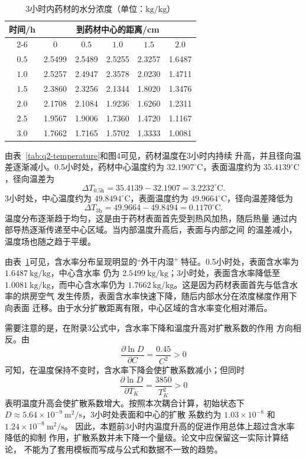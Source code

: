 \documentclass[12pt,a4paper]{article}
\begin{document}
\begin{table}[H]
\centering
\caption{3小时内药材的水分浓度（单位：$\mathrm{kg/kg}$）}
\label{tab:q2-moisture}
\begin{tabular}{cccccc}
\toprule
\multirow{2}{*}{时间/h}
& \multicolumn{5}{c}{到药材中心的距离/cm}\\
\cmidrule(lr){2-6}
& $0$ & $0.5$ & $1.0$ & $1.5$ & $2.0$\\
\midrule
$0.5$ & 2.5499 & 2.5489 & 2.5255 & 2.3257 & 1.6487\\
$1.0$ & 2.5257 & 2.4947 & 2.3578 & 2.0230 & 1.4711\\
$1.5$ & 2.3860 & 2.3256 & 2.1344 & 1.8020 & 1.3476\\
$2.0$ & 2.1708 & 2.1084 & 1.9236 & 1.6260 & 1.2311\\
$2.5$ & 1.9567 & 1.9006 & 1.7360 & 1.4720 & 1.1167\\
$3.0$ & 1.7662 & 1.7165 & 1.5702 & 1.3333 & 1.0081\\
\bottomrule
\end{tabular}
\end{table}


由表~\ref{tab:q2-temperature}和图4可见，药材温度在3小时内持续
升高，并且径向温差逐渐减小。0.5小时处，药材中心温度约为
$32.1907^\circ\mathrm{C}$，表面温度约为
$35.4139^\circ\mathrm{C}$，径向温差为
\begin{equation}
\Delta T_{0.5\mathrm h}
=
35.4139-32.1907
=
3.2232^\circ\mathrm{C}.
\end{equation}
3小时处，中心温度约为 $49.8494^\circ\mathrm{C}$，表面温度约为
$49.9664^\circ\mathrm{C}$，径向温差降低为
\begin{equation}
\Delta T_{3\mathrm h}
=
49.9664-49.8494
=
0.1170^\circ\mathrm{C}.
\end{equation}
温度分布逐渐趋于均匀，这是由于药材表面首先受到热风加热，随后热量
通过内部导热逐渐传递至中心区域。当内部温度升高后，表面与内部之间
的温差减小，温度场也随之趋于平缓。

由表~\ref{tab:q2-moisture}可见，含水率分布呈现明显的“外干内湿”
特征。0.5小时处，表面含水率为 $1.6487\ \mathrm{kg/kg}$，中心含水率
仍为 $2.5499\ \mathrm{kg/kg}$；3小时处，表面含水率降低至
$1.0081\ \mathrm{kg/kg}$，而中心含水率仍为
$1.7662\ \mathrm{kg/kg}$。这是因为药材表面首先与低含水率的烘房空气
发生传质，表面含水率快速下降，随后内部水分在浓度梯度作用下向表面
迁移。由于水分扩散距离有限，中心区域的含水率变化相对滞后。

需要注意的是，在附录3公式中，含水率下降和温度升高对扩散系数的作用
方向相反。由
\begin{equation}
\frac{\partial\ln D}{\partial C}
=
\frac{0.45}{C^2}>0
\end{equation}
可知，在温度保持不变时，含水率下降会使扩散系数减小；但同时
\begin{equation}
\frac{\partial\ln D}{\partial T_K}
=
\frac{3850}{T_K^2}>0
\end{equation}
表明温度升高会使扩散系数增大。按照本次耦合计算，初始状态下
$D\approx5.64\times10^{-9}\ \mathrm{m^2/s}$，3小时处表面和中心的扩散
系数约为 $1.03\times10^{-8}$ 和 $1.24\times10^{-8}\ \mathrm{m^2/s}$。
因此，本题前3小时内温度升高的促进作用总体上超过含水率降低的抑制
作用，扩散系数并未下降一个量级。论文中应保留这一实际计算结论，
不能为了套用模板而写成与公式和数据不一致的趋势。
\end{document}
